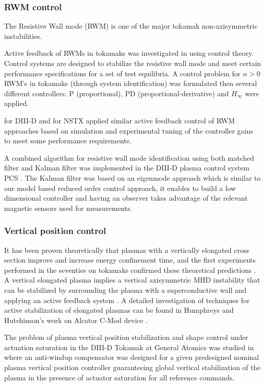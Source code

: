\documentclass[12pt,lot, lof]{puthesis}
\begin{document}
\subsubsection{RWM control}
The Resistive Wall mode (RWM) is one of the major tokamak non-axisymmetric instabilities.

Active feedback of RWMs in tokamaks was investigated in \cite{Fransson00} using control
theory. Control systems are designed to stabilize the resistive wall mode and meet certain performance specifications for a set of test equilibria. A control problem for $n > 0$ RWM’s in tokamaks (through system identification) was formulated then several different controllers: P (proportional), PD (proportional-derivative) and $H_{\infty}$ were applied.

\cite{Garofalo01} for DIII-D and  \cite{Sabbagh04} for NSTX applied similar active feedback control of RWM approaches based on simulation and experimental tuning of the controller gains to meet some performance requirements.

A combined algorithm for resistive wall mode identification using both matched filter and Kalman filter was implemented in the DIII-D plasma control system PCS \cite{In06}. The Kalman filter was based on an eigenmode approach which is similar to our model based reduced order control approach, it enables to build a low dimensional controller and having an observer takes advantage of the relevant magnetic sensors used for measurements. 

\subsubsection{Vertical position control}
It has been proven theoretically that plasmas with a vertically elongated cross section improve and increase energy confinement time, and the first experiments performed in the seventies on tokamaks confirmed these theoretical predictions \cite{Pironti05,Robinson78}. A vertical elongated plasma implies a vertical axisymmetric MHD instability that can be stabilized by surrounding the plasma with a superconductive wall \cite{Mori87, Okabayashi74, Blum81} and applying an active feedback system \cite{Rebhan78}. A detailed investigation of techniques for active stabilization of elongated plasmas can be found in Humphreys and Hutchinson's work on Alcator C-Mod device \cite{Humphreys89}.

The problem of plasma vertical position stabilization and shape control under actuation saturation in the DIII-D Tokamak at General Atomics was studied in \cite{Schuster03} where an anti-windup compensator was designed for a given predesigned nominal plasma vertical position controller guaranteeing global vertical stabilization of the plasma in the presence of actuator saturation for all reference commands.
\end{document}
